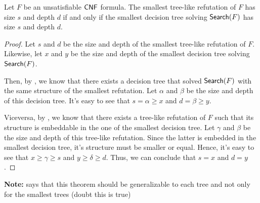 \begin{theorem}
Let $F$ be an unsatisfiable $\mathsf{CNF}$ formula. The smallest tree-like refutation of $F$ has size $s$ and depth $d$ if and only if the smallest decision tree solving $\mathsf{Search}(F)$ has size $s$ and depth $d$.
\end{theorem}

\begin{proof}
    Let $s$ and $d$ be the size and depth of the smallest tree-like refutation of $F$. Likewise, let $x$ and $y$ be the size and depth of the smallest decision tree solving $\mathsf{Search}(F)$.

    Then, by , we know that there exists a decision tree that solved $\mathsf{Search}(F)$ with the same structure of the smallest refutation. Let $\alpha$ and $\beta$ be the size and depth of this decision tree. It's easy to see that $s = \alpha \geq x$ and $d = \beta \geq y$.

    Viceversa, by , we know that there exists a tree-like refutation of $F$ such that its structure is embeddable in the one of the smallest decision tree. Let $\gamma$ and $\beta$ be the size and depth of this tree-like refutation. Since the latter is embedded in the smallest decision tree, it's structure must be smaller or equal. Hence, it's easy to see that $x \geq \gamma \geq s$ and $y \geq \delta \geq d$. Thus, we can conclude that $s = x$ and $d = y$.

\end{proof}

\textbf{Note:} \cite{proofs_circuits_communication} says that this theorem should be generalizable to each tree and not only for the smallest trees (doubt this is true)

\newpage

